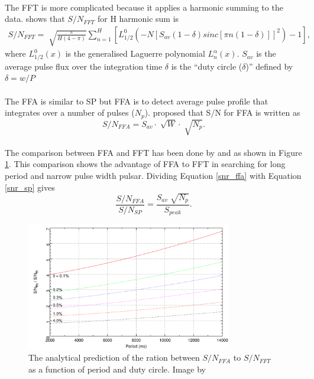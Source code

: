 \documentclass[thesis_msc.tex]{subfiles}
\begin{document}
        \paragraph{} The FFT is more complicated because it applies a harmonic summing to the data.\cite{kondratiev2009new} shows that $S/N_{FFT}$ for H harmonic sum is  
        		\begin{eqnarray}
		S/N_{FFT}=\sqrt[]{\frac{\pi}{H(4-\pi)}} \sum^H_{n=1}[L^0_{1/2}(-N[S_{av}(1-\delta)sinc[\pi n (1-\delta)]]^2)-1] \label{snr_fft},
		\end{eqnarray}    
where $L^0_{1/2}(x)$ is the generalised Laguerre polynomial $L^{\alpha}_{n}(x)$.  $S_{av}$ is the average pulse flux over the integration time  %
        $\delta$ is the ``duty circle ($\delta$)'' defined by $\delta=w/P$
        \paragraph{} The FFA is similar to SP but FFA is to detect average pulse profile that integrates over a number of pulses ($N_p$).  \cite{kondratiev2009new} proposed that S/N for FFA is written as
        \begin{equation}
		S/N_{FFA}=S_{av} \cdot \sqrt[]{W} \cdot \sqrt[]{N_p}. \label{snr_ffa}
		\end{equation}
	\paragraph{} The comparison between FFA and FFT has been done by \cite{Andrew} and \cite{kondratiev2009new} as shown in Figure \ref{FFA_FFT_com}. This comparison shows the advantage of FFA to FFT in searching for long period and narrow pulse width pulsar.  Dividing Equation  \ref{snr_ffa} with Equation \ref{snr_sp} gives 
    \begin{equation} \label{r}
    \frac{S/N_{FFA}}{S/N_{SP}}=\frac{S_{av} \sqrt[]{N_p}}{S_{peak}}.
    \end{equation}
    
\begin{figure}[h] \centering
\includegraphics[width=0.80\textwidth]{figures/FFA_FFT.png}
\caption{The analytical prediction of the ration between $S/N_{FFA}$ to $S/N_{FFT}$ as a function of period and duty circle. Image by ~\cite{Andrew}}
\label{FFA_FFT_com}
\end{figure}
\end{document}

